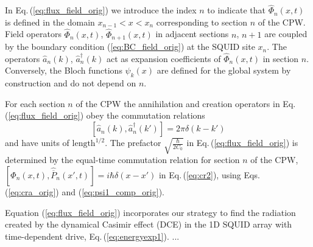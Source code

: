 In Eq.\,(\ref{eq:flux_field_orig})
we introduce the index $n$ to indicate that $\hat{\Phi}_n(x,t)$ is defined in the domain
$x_{n-1} < x < x_n$ corresponding to section $n$ of the CPW. Field operators $\hat{\Phi}_n(x,t)$,
$\hat{\Phi}_{n+1}(x,t)$ in adjacent sections $n$, $n+1$ are coupled by the boundary condition 
(\ref{eq:BC_field_orig}) at the SQUID site $x_n$.
The operators $\hat{a}_n(k)$, $\hat{a}_n^{\dagger}(k)$ act as expansion coefficients of 
$\hat{\Phi}_n(x,t)$ in section $n$.
Conversely, the Bloch functions $\psi_k(x)$ are defined for the global system by construction 
and do not depend on $n$.

For each section $n$ of the CPW the annihilation and creation operators in 
Eq.\,(\ref{eq:flux_field_orig}) obey the commutation relations
%
\begin{equation} \label{eq:cra_orig}
    \left[ \hat{a}_n(k),{\hat a}_n^\dagger(k') \right] = 2 \pi \delta(k - k')
\end{equation}
%
and have units of $\text{length}^{1/2}$.
The prefactor $\displaystyle{\sqrt{\frac{\hbar}{2 C_0}}}$ in Eq.\,(\ref{eq:flux_field_orig}) 
is determined by the equal-time commutation relation for section $n$ of the CPW,
$\left[\hat{\Phi}_n(x,t), \hat{\overline{P}}_n(x',t) \right] = i \hbar \delta(x - x')$ 
in Eq.\,(\ref{eq:cr2}), using Eqs.\,(\ref{eq:cra_orig}) and (\ref{eq:psi1_comp_orig}).

Equation (\ref{eq:flux_field_orig}) incorporates our strategy to find the radiation created by the 
dynamical Casimir effect (DCE) in the 1D SQUID array with time-dependent drive, Eq.\,(\ref{eq:energyexp1}). 
...

\color{black}

